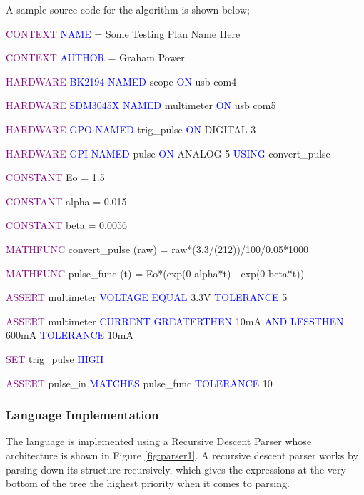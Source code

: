 \documentclass[sigconf,authordraft]{acmart}
\begin{document}
A sample source code for the algorithm is shown below;

\textcolor{purple}{CONTEXT} \textcolor{blue}{NAME} = Some Testing Plan Name Here

\textcolor{purple}{CONTEXT} \textcolor{blue}{AUTHOR} = Graham Power

\textcolor{purple}{HARDWARE} \textcolor{blue}{BK2194} \textcolor{blue}{NAMED} scope \textcolor{blue}{ON} usb com4

\textcolor{purple}{HARDWARE} \textcolor{blue}{SDM3045X} \textcolor{blue}{NAMED} multimeter \textcolor{blue}{ON} usb com5

\textcolor{purple}{HARDWARE} \textcolor{blue}{GPO} \textcolor{blue}{NAMED} trig\_pulse \textcolor{blue}{ON} DIGITAL 3

\textcolor{purple}{HARDWARE} \textcolor{blue}{GPI} \textcolor{blue}{NAMED} pulse \textcolor{blue}{ON} ANALOG 5 \textcolor{blue}{USING} convert\_pulse

\textcolor{purple}{CONSTANT} Eo = 1.5

\textcolor{purple}{CONSTANT} alpha = 0.015

\textcolor{purple}{CONSTANT} beta = 0.0056


\textcolor{purple}{MATHFUNC} convert\_pulse (raw) = raw*(3.3/(212))/100/0.05*1000

\textcolor{purple}{MATHFUNC} pulse\_func (t) = Eo*(exp(0-alpha*t) - exp(0-beta*t))

\textcolor{purple}{ASSERT} multimeter \textcolor{blue}{VOLTAGE} \textcolor{blue}{EQUAL} 3.3V \textcolor{blue}{TOLERANCE} 5%

\textcolor{purple}{ASSERT} multimeter \textcolor{blue}{CURRENT} \textcolor{blue}{GREATERTHEN} 10mA \textcolor{blue}{AND} \textcolor{blue}{LESSTHEN} 600mA \textcolor{blue}{TOLERANCE} 10mA

\textcolor{purple}{SET} trig\_pulse \textcolor{blue}{HIGH}

\textcolor{purple}{ASSERT} pulse\_in \textcolor{blue}{MATCHES} pulse\_func \textcolor{blue}{TOLERANCE} 10%


\subsubsection{Language Implementation}
The language is implemented using a Recursive Descent Parser \cite{DSL:Parser} whose architecture is shown in Figure \ref{fig:parser1}. A recursive descent parser works by parsing down its structure recursively, which gives the expressions at the very bottom of the tree the highest priority when it comes to parsing. 
\end{document}
